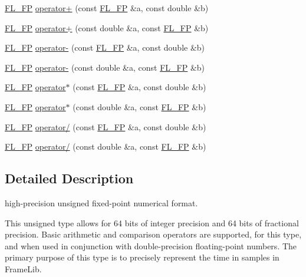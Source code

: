 \begin{DoxyCompactItemize}
\item 
\hyperlink{class_f_l___f_p}{F\+L\+\_\+\+FP} \hyperlink{class_f_l___f_p_a230919bb5d28822bd782aa7ca3465eba}{operator+} (const \hyperlink{class_f_l___f_p}{F\+L\+\_\+\+FP} \&a, const double \&b)
\item 
\hyperlink{class_f_l___f_p}{F\+L\+\_\+\+FP} \hyperlink{class_f_l___f_p_a4934b87fe91ceefeb77cc0fbf926329c}{operator+} (const double \&a, const \hyperlink{class_f_l___f_p}{F\+L\+\_\+\+FP} \&b)
\item 
\hyperlink{class_f_l___f_p}{F\+L\+\_\+\+FP} \hyperlink{class_f_l___f_p_a4355725c40ad917191e6384f58177915}{operator-\/} (const \hyperlink{class_f_l___f_p}{F\+L\+\_\+\+FP} \&a, const double \&b)
\item 
\hyperlink{class_f_l___f_p}{F\+L\+\_\+\+FP} \hyperlink{class_f_l___f_p_afede6b6bcb4b0e35903a5e47cb0096e1}{operator-\/} (const double \&a, const \hyperlink{class_f_l___f_p}{F\+L\+\_\+\+FP} \&b)
\item 
\hyperlink{class_f_l___f_p}{F\+L\+\_\+\+FP} \hyperlink{class_f_l___f_p_a4d88f005bc60cbdceb070335a94a068a}{operator$\ast$} (const \hyperlink{class_f_l___f_p}{F\+L\+\_\+\+FP} \&a, const double \&b)
\item 
\hyperlink{class_f_l___f_p}{F\+L\+\_\+\+FP} \hyperlink{class_f_l___f_p_a248f294ecf7ddc53650ef72b848e6bb5}{operator$\ast$} (const double \&a, const \hyperlink{class_f_l___f_p}{F\+L\+\_\+\+FP} \&b)
\item 
\hyperlink{class_f_l___f_p}{F\+L\+\_\+\+FP} \hyperlink{class_f_l___f_p_a10e4527f31f6a72dfc92215a83bbf439}{operator/} (const \hyperlink{class_f_l___f_p}{F\+L\+\_\+\+FP} \&a, const double \&b)
\item 
\hyperlink{class_f_l___f_p}{F\+L\+\_\+\+FP} \hyperlink{class_f_l___f_p_a748c3789021613fe839afe4289689f88}{operator/} (const double \&a, const \hyperlink{class_f_l___f_p}{F\+L\+\_\+\+FP} \&b)
\end{DoxyCompactItemize}


\subsection{Detailed Description}
high-\/precision unsigned fixed-\/point numerical format. 

This unsigned type allows for 64 bits of integer precision and 64 bits of fractional precision. Basic arithmetic and comparison operators are supported, for this type, and when used in conjunction with double-\/precision floating-\/point numbers. The primary purpose of this type is to precisely represent the time in samples in Frame\+Lib. 

